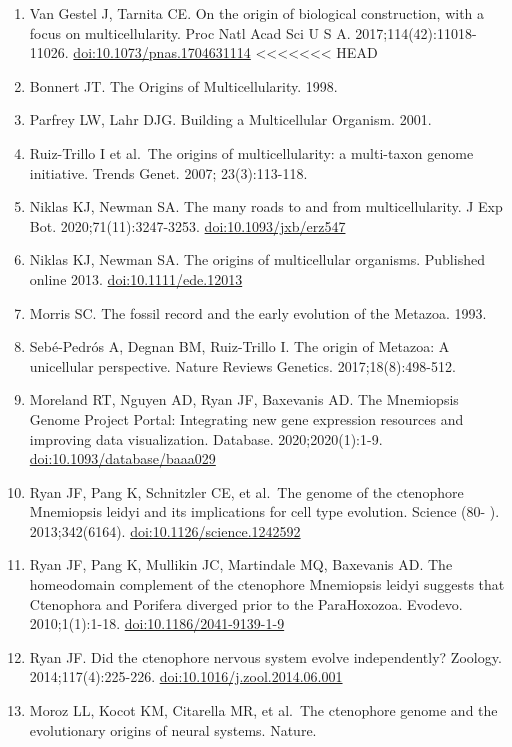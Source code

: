 \documentclass[
]{article}
\providecommand{\tightlist}{%
  \setlength{\itemsep}{0pt}\setlength{\parskip}{0pt}}
\begin{document}
\begin{enumerate}
\def\labelenumi{\arabic{enumi}.}
\tightlist
\item
  Van Gestel J, Tarnita CE. On the origin of biological construction,
  with a focus on multicellularity. Proc Natl Acad Sci U S A.
  2017;114(42):11018-11026. \url{doi:10.1073/pnas.1704631114}
  \textless\textless\textless\textless\textless\textless\textless{} HEAD
\item
  Bonnert JT. The Origins of Multicellularity. 1998.
\item
  Parfrey LW, Lahr DJG. Building a Multicellular Organism. 2001.
\item
  Ruiz-Trillo I et al.~The origins of multicellularity: a multi-taxon
  genome initiative. Trends Genet. 2007; 23(3):113-118.
\item
  Niklas KJ, Newman SA. The many roads to and from multicellularity. J
  Exp Bot. 2020;71(11):3247-3253. \url{doi:10.1093/jxb/erz547}
\item
  Niklas KJ, Newman SA. The origins of multicellular organisms.
  Published online 2013. \url{doi:10.1111/ede.12013}
\item
  Morris SC. The fossil record and the early evolution of the Metazoa.
  1993.
\item
  Sebé-Pedrós A, Degnan BM, Ruiz-Trillo I. The origin of Metazoa: A
  unicellular perspective. Nature Reviews Genetics. 2017;18(8):498-512.
\item
  Moreland RT, Nguyen AD, Ryan JF, Baxevanis AD. The Mnemiopsis Genome
  Project Portal: Integrating new gene expression resources and
  improving data visualization. Database. 2020;2020(1):1-9.
  \url{doi:10.1093/database/baaa029}
\item
  Ryan JF, Pang K, Schnitzler CE, et al.~The genome of the ctenophore
  Mnemiopsis leidyi and its implications for cell type evolution.
  Science (80- ). 2013;342(6164). \url{doi:10.1126/science.1242592}
\item
  Ryan JF, Pang K, Mullikin JC, Martindale MQ, Baxevanis AD. The
  homeodomain complement of the ctenophore Mnemiopsis leidyi suggests
  that Ctenophora and Porifera diverged prior to the ParaHoxozoa.
  Evodevo. 2010;1(1):1-18. \url{doi:10.1186/2041-9139-1-9}
\item
  Ryan JF. Did the ctenophore nervous system evolve independently?
  Zoology. 2014;117(4):225-226. \url{doi:10.1016/j.zool.2014.06.001}
\item
  Moroz LL, Kocot KM, Citarella MR, et al.~The ctenophore genome and the
  evolutionary origins of neural systems. Nature.

\end{enumerate}
\end{document}
